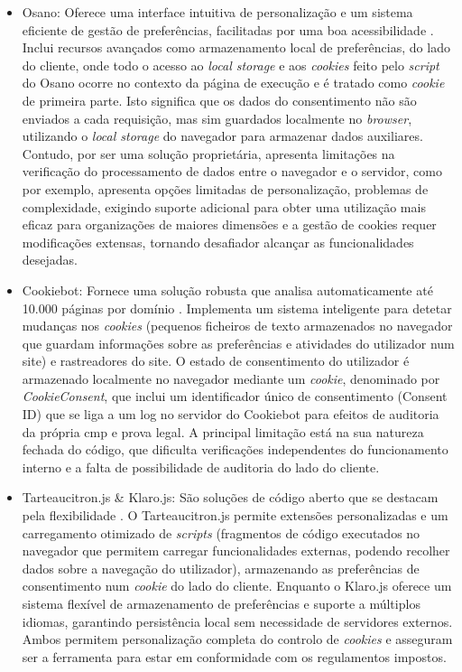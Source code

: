 \begin{itemize}
    \item Osano: Oferece uma interface intuitiva de personalização e um sistema eficiente de gestão de preferências, facilitadas por uma boa acessibilidade \cite{osano}. Inclui recursos avançados como armazenamento local de preferências, do lado do cliente, onde todo o acesso ao \textit{local storage} e aos \textit{cookies} feito pelo \textit{script} do Osano ocorre no contexto da página de execução e é tratado como \textit{cookie} de primeira parte. Isto significa que os dados do consentimento não são enviados a cada requisição, mas sim guardados localmente no \textit{browser}, utilizando o \textit{local storage} do navegador para armazenar dados auxiliares. Contudo, por ser uma solução proprietária, apresenta limitações na verificação do processamento de dados entre o navegador e o servidor, como por exemplo, apresenta opções limitadas de personalização, problemas de complexidade, exigindo suporte adicional para obter uma utilização mais eficaz para organizações de maiores dimensões e a gestão de cookies requer modificações extensas, tornando desafiador alcançar as funcionalidades desejadas.

    \item Cookiebot: Fornece uma solução robusta que analisa automaticamente até 10.000 páginas por domínio \cite{Cookiebot2024}. Implementa um sistema inteligente para detetar mudanças nos \textit{cookies} (pequenos ficheiros de texto armazenados no navegador que guardam informações sobre as preferências e atividades do utilizador num site) e rastreadores do site. O estado de consentimento do utilizador é armazenado localmente no navegador mediante um \textit{cookie}, denominado por \textit{CookieConsent}, que inclui um identificador único de consentimento (Consent ID) que se liga a um log no servidor do Cookiebot para efeitos de auditoria da própria \acrshort{cmp} e prova legal. A principal limitação está na sua natureza fechada do código, que dificulta verificações independentes do funcionamento interno e a falta de possibilidade de auditoria do lado do cliente.

    \item Tarteaucitron.js \& Klaro.js: São soluções de código aberto que se destacam pela flexibilidade \cite{tarteaucitron}. O Tarteaucitron.js permite extensões personalizadas e um carregamento otimizado de \textit{scripts} (fragmentos de código executados no navegador que permitem carregar funcionalidades externas, podendo recolher dados sobre a navegação do utilizador), armazenando as preferências de consentimento num \textit{cookie} do lado do cliente. Enquanto o Klaro.js oferece um sistema flexível de armazenamento de preferências e suporte a múltiplos idiomas, garantindo persistência local sem necessidade de servidores externos. Ambos permitem personalização completa do controlo de \textit{cookies} e asseguram ser a ferramenta para estar em conformidade com os regulamentos impostos.


\end{itemize}
